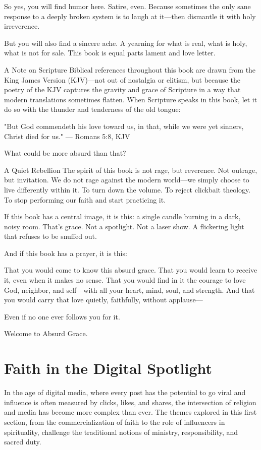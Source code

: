 \documentclass[a4paper,11pt]{book}
\begin{document}
So yes, you will find humor here. Satire, even. Because sometimes the only sane response to a deeply broken system is to laugh at it—then dismantle it with holy irreverence.

But you will also find a sincere ache. A yearning for what is real, what is holy, what is not for sale. This book is equal parts lament and love letter.

A Note on Scripture
Biblical references throughout this book are drawn from the King James Version (KJV)—not out of nostalgia or elitism, but because the poetry of the KJV captures the gravity and grace of Scripture in a way that modern translations sometimes flatten. When Scripture speaks in this book, let it do so with the thunder and tenderness of the old tongue:

"But God commendeth his love toward us, in that, while we were yet sinners, Christ died for us." — Romans 5:8, KJV

What could be more absurd than that?

A Quiet Rebellion
The spirit of this book is not rage, but reverence. Not outrage, but invitation. We do not rage against the modern world—we simply choose to live differently within it. To turn down the volume. To reject clickbait theology. To stop performing our faith and start practicing it.

If this book has a central image, it is this: a single candle burning in a dark, noisy room. That’s grace. Not a spotlight. Not a laser show. A flickering light that refuses to be snuffed out.

And if this book has a prayer, it is this:

That you would come to know this absurd grace. That you would learn to receive it, even when it makes no sense. That you would find in it the courage to love God, neighbor, and self—with all your heart, mind, soul, and strength. And that you would carry that love quietly, faithfully, without applause—

Even if no one ever follows you for it.

Welcome to Absurd Grace.

\chapter{Faith in the Digital Spotlight}

In the age of digital media, where every post has the potential to go viral and influence is often measured by clicks, likes, and shares, the intersection of religion and media has become more complex than ever. The themes explored in this first section, from the commercialization of faith to the role of influencers in spirituality, challenge the traditional notions of ministry, responsibility, and sacred duty.
\end{document}
